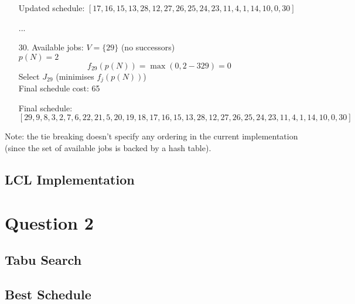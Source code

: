 \documentclass[fleqn]{article}
\begin{document}
\begin{enumerate}
      Updated schedule: $[17, 16, 15, 13, 28, 12, 27, 26, 25, 24, 23, 11, 4, 1, 14, 10, 0, 30]$

      \item[...]

      \item[30.] Available jobs: $V = \{ 29 \}$ (no successors) \\
      $p(N) = 2$
      \[
      f_{29}(p(N)) = \max(0, 2 - 329) = 0
      \]    
      Select $J_{29}$ (minimises $f_j(p(N))$) \\
      Final schedule cost: 65

      Final schedule: $[29, 9, 8, 3, 2, 7, 6, 22, 21, 5, 20, 19, 18, 17, 16, 15, 13, 28, 12, 27, 26, 25, 24, 23, 11, 4, 1, 14, 10, 0, 30]$
    \end{enumerate}

    Note: the tie breaking doesn't specify any ordering in the current implementation (since the set of available jobs is backed by a hash table).

  \subsection{LCL Implementation}

  \section{Question 2}
  \subsection{Tabu Search}

  \subsection{Best Schedule}
\end{document}
